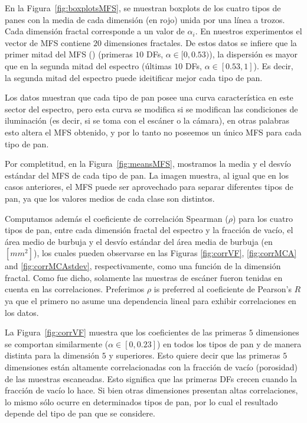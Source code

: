 En la Figura~\ref{fig:boxplotsMFS}, se muestran boxplots de los cuatro tipos de panes con la media de cada dimensión (en rojo) unida por una línea a trozos. Cada dimensión fractal corresponde a un valor de $\alpha_{i}$. En nuestros experimentos el vector de MFS contiene $20$ dimensiones fractales. De estos datos se infiere que la primer mitad del MFS () (primeras $10$ DFs, $\alpha \in [0,0.53)$), la dispersión es mayor que en la segunda mitad del espectro  (últimas $10$ DFs, $\alpha \in [0.53,1]$). Es decir, la segunda mitad del espectro puede ideitificar mejor cada tipo de pan.

Los datos muestran que cada tipo de pan posee una curva característica en este sector del espectro, pero esta curva se modifica si se modifican las condiciones de iluminación (es decir, si se toma con el escáner o la cámara), en otras palabras esto altera el MFS obtenido, y por lo tanto no poseemos un único MFS para cada tipo de pan. 

Por completitud, en la Figura~\ref{fig:meansMFS}, mostramos la media y el desvío estándar del MFS de cada tipo de pan. La imagen muestra, al igual que en los casos anteriores, el MFS puede ser aprovechado para separar diferentes tipos de pan, ya que los valores medios de cada clase son distintos.

Computamos además el coeficiente de correlación Spearman ($\rho$) para los cuatro tipos de pan, entre cada dimensión fractal del espectro y la fracción de vacío, el área medio de burbuja y el desvío estándar del área media de burbuja (en $[mm^{2}]$), los cuales pueden observarse en las Figuras \ref{fig:corrVF}, \ref{fig:corrMCA} and \ref{fig:corrMCAstdev}, respectivamente, como una función de la dimensión fractal. Como fue dicho, solamente las muestras de escáner fueron tenidas en cuenta en las correlaciones. Preferimos $\rho$ is preferred al coeficiente de Pearson's $R$ ya que el primero no asume una dependencia lineal para exhibir correlaciones en los datos.

La Figura~\ref{fig:corrVF} muestra que los coeficientes de las primeras $5$ dimensiones se comportan similarmente ($\alpha \in [0,0.23]$) en todos los tipos de pan y de manera distinta para la dimensión $5$ y superiores. Esto quiere decir que las primeras $5$ dimensiones están altamente correlacionadas con la fracción de vacío (porosidad) de las muestras escaneadas. Esto significa que las primeras DFs crecen cuando la fracción de vacío lo hace. Si bien otras dimensiones presentan altas correlaciones, lo mismo sólo ocurre en determinados tipos de pan, por lo cual el resultado depende del tipo de pan que se considere.

